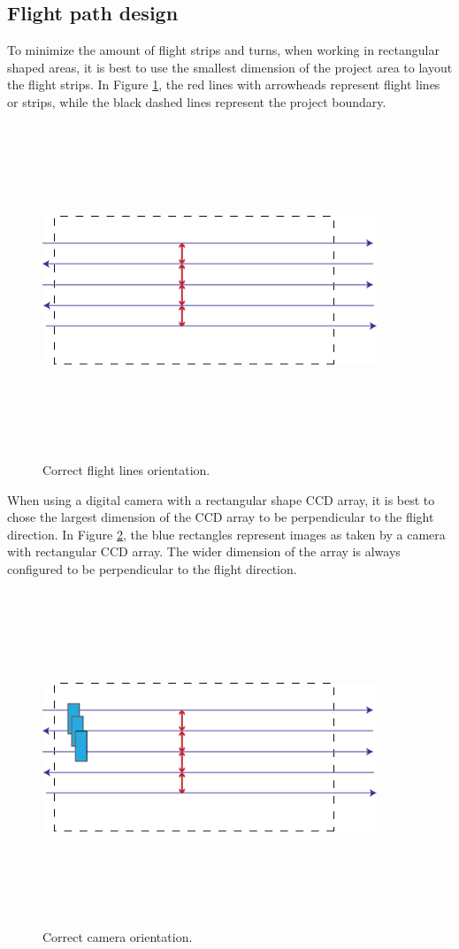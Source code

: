 \subsection{Flight path design}
To minimize the amount of flight strips and turns, when working in rectangular shaped areas, it is best to use the smallest dimension of the project area to layout the flight strips. In Figure \ref{fig:line_orientaion}, the red lines with arrowheads represent flight lines or strips, while the black dashed lines represent the project boundary.
\begin{figure}[H]
\centering
\includegraphics[width=10cm,height=10cm,keepaspectratio]{imagenes/Fligth_path.png}
\caption{Correct flight lines orientation.}
\label{fig:line_orientaion}
\end{figure}
When using a digital camera with a rectangular shape CCD array, it is best to chose the largest dimension of the CCD array to be perpendicular to the flight direction. In Figure \ref{fig:camera_orientaion}, the blue rectangles represent images as taken by a camera with rectangular CCD array. The wider dimension of the array is always configured to be perpendicular to the flight direction.\cite{GCP}
\begin{figure}[H]
\centering
\includegraphics[width=10cm,height=10cm,keepaspectratio]{imagenes/Camera_Orientation.png}
\caption{Correct camera orientation.}
\label{fig:camera_orientaion}
\end{figure}
